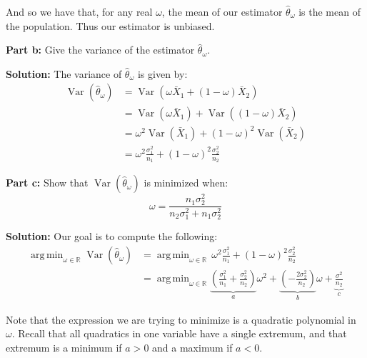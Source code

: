 \documentclass{article}
\DeclareMathOperator{\Var}{Var}
\DeclareMathOperator*{\argmin}{arg\,min}
\begin{document}
And so we have that, for any real $\omega$, the mean of our estimator $\hat\theta_\omega$ is the mean of the population. Thus our estimator is unbiased.
\bigskip

\noindent\textbf{Part b:} Give the variance of the estimator $\hat\theta_\omega$.
\bigskip

\noindent\textbf{Solution:} The variance of $\hat\theta_\omega$ is given by:
\begin{align*}
    \Var(\hat\theta_\omega)&=\Var(\omega\bar X_1+(1-\omega)\bar X_2)\tag{def. of $\hat\theta_\omega$}\\
    &=\Var(\omega\bar X_1)+\Var((1-\omega)\bar X_2)\tag{variance of independent RVs}\\
    &=\omega^2\Var(\bar X_1)+(1-\omega)^2\Var(\bar X_2)\tag{variance of multiple of RV}\\
    &=\omega^2\frac{\sigma^2_1}{n_1}+(1-\omega)^2\frac{\sigma^2_2}{n_2}\tag{variance of sample mean}
\end{align*}
\smallskip
\newpage

\noindent\textbf{Part c:} Show that $\Var(\hat\theta_\omega)$ is minimized when:
$$\omega=\frac{n_1\sigma^2_2}{n_2\sigma^2_1+n_1\sigma^2_2}$$
\bigskip

\noindent\textbf{Solution:} Our goal is to compute the following:
\begin{align*}
    \argmin_{\omega\in\mathbb R}\Var(\hat\theta_\omega)&=\argmin_{\omega\in\mathbb R}\,\omega^2\frac{\sigma^2_1}{n_1}+(1-\omega)^2\frac{\sigma^2_2}{n_2}\tag{part b}\\
    &=\argmin_{\omega\in\mathbb R}\underbrace{\left(\frac{\sigma^2_1}{n_1}+\frac{\sigma^2_2}{n_2}\right)}_{a}\omega^2+\underbrace{\left(-\frac{2\sigma^2_2}{n_2}\right)}_{b}\omega+\underbrace{\frac{\sigma^2}{n_2}}_{c}
\end{align*}

Note that the expression we are trying to minimize is a quadratic polynomial in $\omega$. Recall that all quadratics in one variable have a single extremum, and that extremum is a minimum if $a>0$ and a maximum if $a<0$.
\end{document}
